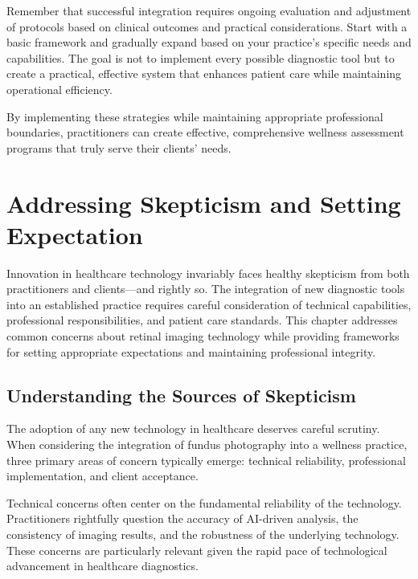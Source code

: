 \documentclass[
  Letterpaper,
]{scrbook}
\begin{document}
Remember that successful integration requires ongoing evaluation and
adjustment of protocols based on clinical outcomes and practical
considerations. Start with a basic framework and gradually expand based
on your practice's specific needs and capabilities. The goal is not to
implement every possible diagnostic tool but to create a practical,
effective system that enhances patient care while maintaining
operational efficiency.

By implementing these strategies while maintaining appropriate
professional boundaries, practitioners can create effective,
comprehensive wellness assessment programs that truly serve their
clients' needs.


\chapter{Addressing Skepticism and Setting
Expectation}\label{addressing-skepticism-and-setting-expectation}

Innovation in healthcare technology invariably faces healthy skepticism
from both practitioners and clients---and rightly so. The integration of
new diagnostic tools into an established practice requires careful
consideration of technical capabilities, professional responsibilities,
and patient care standards. This chapter addresses common concerns about
retinal imaging technology while providing frameworks for setting
appropriate expectations and maintaining professional integrity.

\section{Understanding the Sources of
Skepticism}\label{understanding-the-sources-of-skepticism}

The adoption of any new technology in healthcare deserves careful
scrutiny. When considering the integration of fundus photography into a
wellness practice, three primary areas of concern typically emerge:
technical reliability, professional implementation, and client
acceptance.

Technical concerns often center on the fundamental reliability of the
technology. Practitioners rightfully question the accuracy of AI-driven
analysis, the consistency of imaging results, and the robustness of the
underlying technology. These concerns are particularly relevant given
the rapid pace of technological advancement in healthcare diagnostics.
\end{document}
